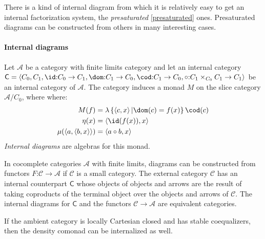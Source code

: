 \documentclass{tac}
\newcommand\keyword[1]{\emph{#1}\label{#1}}
\newcommand\cat\mathcal
\newcommand\icat\mathsf
\newcommand\of{\mathord:}
\newcommand\set[1]{\left\{#1\right\}}
\newcommand\tuplet[1]{\left\langle #1 \right\rangle}
\begin{document}
There is a kind of internal diagram from which it is relatively easy to get an internal factorization system, the \emph{presaturated} \ref{presaturated} ones. %
Presaturated diagrams can be constructed from others in many interesting cases. %

\paragraph{Internal diagrams}
\begin{definition} Let $\cat A$ be a category with finite limits category and let an internal category $\icat C = \tuplet{C_0,C_1,\id\of C_0\to C_1,\dom\of C_1\to C_0,\cod\of C_1\to C_0,\circ\of C_1\times_{C_0}C_1\to C_1}$ be an internal category of $\cat A$. 
The category induces a monad $M$ on the slice category $\cat A/C_0$, where where:
\begin{align*}
M(f) &= \lambda\set{\tuplet{c,x}| \dom(c)=f(x)}\cod(c) \\
\eta(x) &= \tuplet{\id(f(x)),x}\\
\mu(\tuplet{a,\tuplet{b,x}}) &= \tuplet{a\circ b,x}
\end{align*}
\keyword{Internal diagrams} are algebras for this monad.
\end{definition}

\begin{example}
In cocomplete categories $\cat A$ with finite limits, diagrams can be constructed from functors $F\of\cat C\to\cat A$ if $\cat C$ is a small category. The external category $\cat C$ has an internal counterpart $\icat C$ whose objects of objects and arrows are the result of taking coproducts of the terminal object over the objects and arrows of $\cat C$. The internal diagrams for $\icat C$ and the functors $\cat C\to \cat A$ are equivalent categories.
\end{example}

If the ambient category is locally Cartesian closed and has stable coequalizers, then the density comonad can be internalized as well.
\end{document}
